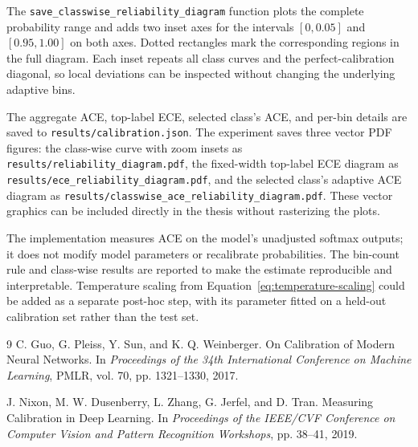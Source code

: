 \documentclass[12pt,a4paper]{article}
\begin{document}
The \texttt{save\_classwise\_reliability\_diagram} function plots the complete probability range and adds two inset axes for the intervals $[0,0.05]$ and $[0.95,1.00]$ on both axes. Dotted rectangles mark the corresponding regions in the full diagram. Each inset repeats all class curves and the perfect-calibration diagonal, so local deviations can be inspected without changing the underlying adaptive bins.

The aggregate ACE, top-label ECE, selected class's ACE, and per-bin details are saved to \texttt{results/calibration.json}. The experiment saves three vector PDF figures: the class-wise curve with zoom insets as \texttt{results/reliability\_diagram.pdf}, the fixed-width top-label ECE diagram as \texttt{results/ece\_reliability\_diagram.pdf}, and the selected class's adaptive ACE diagram as \texttt{results/classwise\_ace\_reliability\_diagram.pdf}. These vector graphics can be included directly in the thesis without rasterizing the plots.

The implementation measures ACE on the model's unadjusted softmax outputs; it does not modify model parameters or recalibrate probabilities. The bin-count rule and class-wise results are reported to make the estimate reproducible and interpretable. Temperature scaling from Equation~\eqref{eq:temperature-scaling} could be added as a separate post-hoc step, with its parameter fitted on a held-out calibration set rather than the test set.

\begin{thebibliography}{9}
C. Guo, G. Pleiss, Y. Sun, and K. Q. Weinberger.
\newblock On Calibration of Modern Neural Networks.
\newblock In \emph{Proceedings of the 34th International Conference on Machine Learning}, PMLR, vol. 70, pp. 1321--1330, 2017.

J. Nixon, M. W. Dusenberry, L. Zhang, G. Jerfel, and D. Tran.
\newblock Measuring Calibration in Deep Learning.
\newblock In \emph{Proceedings of the IEEE/CVF Conference on Computer Vision and Pattern Recognition Workshops}, pp. 38--41, 2019.

\end{thebibliography}
\end{document}
